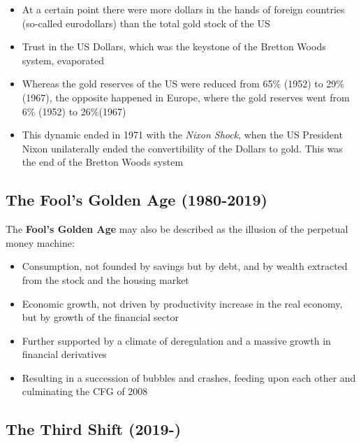 \documentclass[a4paper]{extarticle}
\begin{document}
\begin{itemize}
    \item At a certain point there were more dollars in the hands of foreign countries (so-called eurodollars) than the total gold stock of the US
    \item Trust in the US Dollars, which was the keystone of the Bretton Woods system, evaporated
    \item Whereas the gold reserves of the US were reduced from 65\% (1952) to 29\% (1967), the opposite happened in Europe, where the gold reserves went from 6\% (1952) to 26\%(1967)
    \item This dynamic ended in 1971 with the \textit{Nixon Shock}, when the US President Nixon unilaterally ended the convertibility of the Dollars to gold. This was the end of the Bretton Woods system
\end{itemize}

\subsection{The Fool's Golden Age (1980-2019)}

The \textbf{Fool's Golden Age} may also be described as the illusion of the perpetual money machine:

\begin{itemize}
    \item Consumption, not founded by savings but by debt, and by wealth extracted from the stock and the housing market
    \item Economic growth, not driven by productivity increase in the real economy, but by growth of the financial sector
    \item Further supported by a climate of deregulation and a massive growth in financial derivatives
    \item Resulting in a succession of bubbles and crashes, feeding upon each other and culminating the CFG of 2008
\end{itemize}

\subsection{The Third Shift (2019-)}
\end{document}
